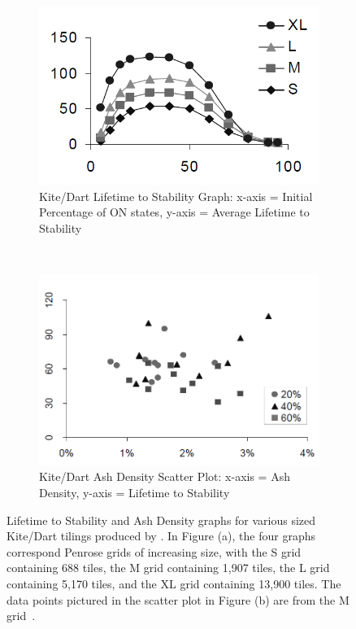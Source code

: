 \documentclass[a4paper,11pt,twoside]{report}
\begin{document}
\begin{figure}[htp]
\centering
\begin{subfigure}[t]{0.6\textwidth}
	\centering
	\includegraphics[width=\textwidth]{ch4_figs/hi05_fig7_lifetime}
	\caption{Kite/Dart Lifetime to Stability Graph: x-axis = Initial Percentage of ON states, y-axis = Average Lifetime to Stability}
\end{subfigure}
~
\begin{subfigure}[t]{0.6\textwidth}
	\centering
	\includegraphics[width=\textwidth]{ch4_figs/hi05_fig8_ash_density}
	\caption{Kite/Dart Ash Density Scatter Plot: x-axis = Ash Density, y-axis = Lifetime to Stability}
\end{subfigure}
\caption[\citeauthor{hi05}'s Kite/Dart Lifetime and Ash Density Graphs]{
	Lifetime to Stability and Ash Density graphs for various sized Kite/Dart tilings produced by \citeauthor{hi05}. In Figure (a), the four graphs correspond Penrose grids of increasing size, with the S grid containing 688 tiles, the M grid containing 1,907 tiles, the L grid containing 5,170 tiles, and the XL grid containing 13,900 tiles. The data points pictured in the scatter plot in Figure (b) are from the M grid~\cite{hi05}.
}
\label{fig:hi05_lifetime_density}
\end{figure}
\end{document}
